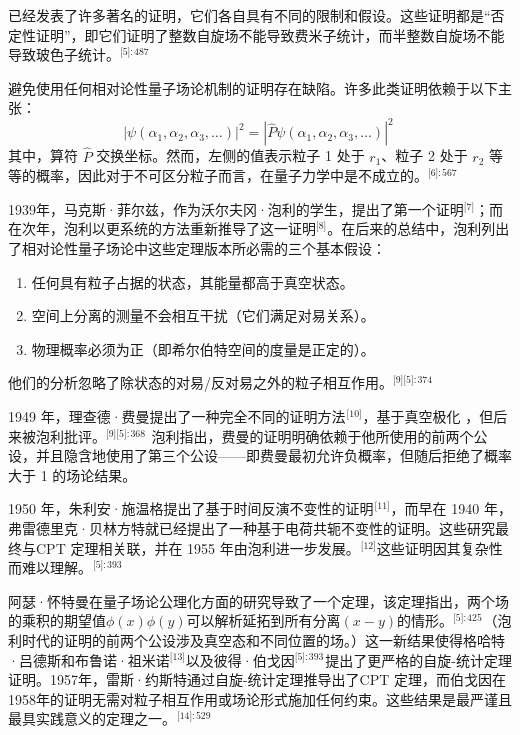 已经发表了许多著名的证明，它们各自具有不同的限制和假设。这些证明都是“否定性证明”，即它们证明了整数自旋场不能导致费米子统计，而半整数自旋场不能导致玻色子统计。\(^\text{[5]: 487 }\)

避免使用任何相对论性量子场论机制的证明存在缺陷。许多此类证明依赖于以下主张：  
\[
|\psi (\alpha _{1},\alpha _{2},\alpha _{3},\dots )|^{2} = |{\hat {P}}\psi (\alpha _{1},\alpha _{2},\alpha _{3},\dots )|^{2}~
\]
其中，算符 \( \hat{P} \) 交换坐标。然而，左侧的值表示粒子 1 处于 \( r_1 \)、粒子 2 处于 \( r_2 \) 等等的概率，因此对于不可区分粒子而言，在量子力学中是不成立的。\(^\text{[6]: 567  }\)

1939年，马克斯·菲尔兹，作为沃尔夫冈·泡利的学生，提出了第一个证明\(^\text{[7]}\)；而在次年，泡利以更系统的方法重新推导了这一证明\(^\text{[8]}\)。在后来的总结中，泡利列出了相对论性量子场论中这些定理版本所必需的三个基本假设：
\begin{enumerate}
\item 任何具有粒子占据的状态，其能量都高于真空状态。
\item 空间上分离的测量不会相互干扰（它们满足对易关系）。
\item 物理概率必须为正（即希尔伯特空间的度量是正定的）。
\end{enumerate}
他们的分析忽略了除状态的对易/反对易之外的粒子相互作用。\(^\text{[9][5]: 374 }\)

1949 年，理查德·费曼提出了一种完全不同的证明方法\(^\text{ [10]}\)，基于真空极化 ，但后来被泡利批评。\(^\text{[9][5]: 368}\)  泡利指出，费曼的证明明确依赖于他所使用的前两个公设，并且隐含地使用了第三个公设——即费曼最初允许负概率，但随后拒绝了概率大于 1 的场论结果。  

1950 年，朱利安·施温格提出了基于时间反演不变性的证明\(^\text{ [11]}\)，而早在 1940 年，弗雷德里克·贝林方特就已经提出了一种基于电荷共轭不变性的证明。这些研究最终与CPT 定理相关联，并在 1955 年由泡利进一步发展。\(^\text{ [12]}\)这些证明因其复杂性而难以理解。\(^\text{ [5]: 393 }\)

阿瑟·怀特曼在量子场论公理化方面的研究导致了一个定理，该定理指出，两个场的乘积的期望值\(\phi (x)\phi (y)\)可以解析延拓到所有分离\((x - y)\)的情形。\(^\text{[5]: 425}\) （泡利时代的证明的前两个公设涉及真空态和不同位置的场。）这一新结果使得格哈特·吕德斯和布鲁诺·祖米诺\(^\text{[13]}\)以及彼得·伯戈因\(^\text{[5]: 393 }\)提出了更严格的自旋-统计定理证明。1957年，雷斯·约斯特通过自旋-统计定理推导出了CPT 定理，而伯戈因在1958年的证明无需对粒子相互作用或场论形式施加任何约束。这些结果是最严谨且最具实践意义的定理之一。\(^\text{ [14]: 529}\)   

